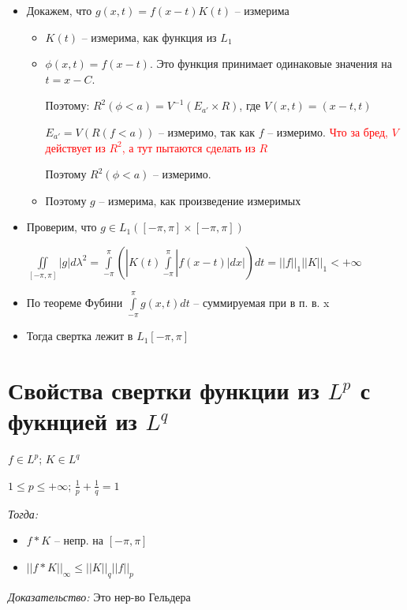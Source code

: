 \documentclass[paper=a4, fontsize=17pt]{article}
\begin{document}
\begin{itemize}
	\item Докажем, что $ g(x, t) = f(x - t)K(t) $ -- измерима
		\begin{itemize}
			\item $ K(t) $ -- измерима, как функция из $ L_1 $
			\item $ \phi(x, t) = f(x - t) $. Это функция принимает одинаковые значения на $ t = x - C $.

			Поэтому: $ R^2(\phi < a) = V^{-1}(E_{a'} \times R)$, где $ V(x, t) = (x - t, t) $

			$ E_{a'} = V(R(f < a)) $ -- измеримо, так как $ f $ -- измеримо.
			\textcolor{red}{Что за бред, $V$ действует из $R^2$, а тут пытаются сделать из $R$}

			Поэтому $ R^2(\phi < a) $ -- измеримо.
			\item Поэтому $ g $ -- измерима, как произведение измеримых
		\end{itemize}

	\item Проверим, что $ g \in L_1([-\pi, \pi]\times[-\pi, \pi]) $

		$ \iint\limits_{[-\pi, \pi]} | g | d\lambda^2 =
		  \int\limits_{-\pi}^{\pi} (|K(t)  \int\limits_{-\pi}^{\pi} | f(x-t)| dx |) dt =
		  ||f||_1 ||K||_1 < +\infty $
	\item По теореме Фубини $ \int\limits_{-\pi}^{\pi} g(x, t) dt $ -- суммируемая при в п. в. x

	\item Тогда свертка лежит в $ L_1[-\pi, \pi] $


\end{itemize}

\section{Свойства свертки функции из $ L^p $ с фукнцией из $ L^q $}

$ f \in L^p $; $ K \in L^q $

$ 1 \leqslant p \leqslant +\infty $; $ \frac{1}{p} + \frac{1}{q} = 1 $

\emph{Тогда:}
\begin{itemize}
	\item $ f \ast K $ -- непр. на $ [-\pi, \pi] $
	\item $ ||f \ast K||_{\infty} \leqslant ||K||_q ||f||_p $
\end{itemize}

\emph{Доказательство:} Это нер-во Гельдера
\end{document}
